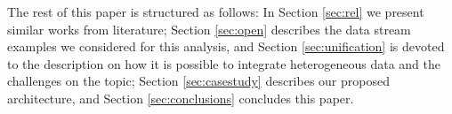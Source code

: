 The rest of this paper is structured as follows: In Section \ref{sec:rel} we present similar works from literature; Section \ref{sec:open} describes the data stream examples we considered for this analysis, and Section \ref{sec:unification} is devoted to the description on how it is possible to integrate heterogeneous data and the challenges on the topic; Section \ref{sec:casestudy} describes our proposed architecture, and Section \ref{sec:conclusions} concludes this paper.
